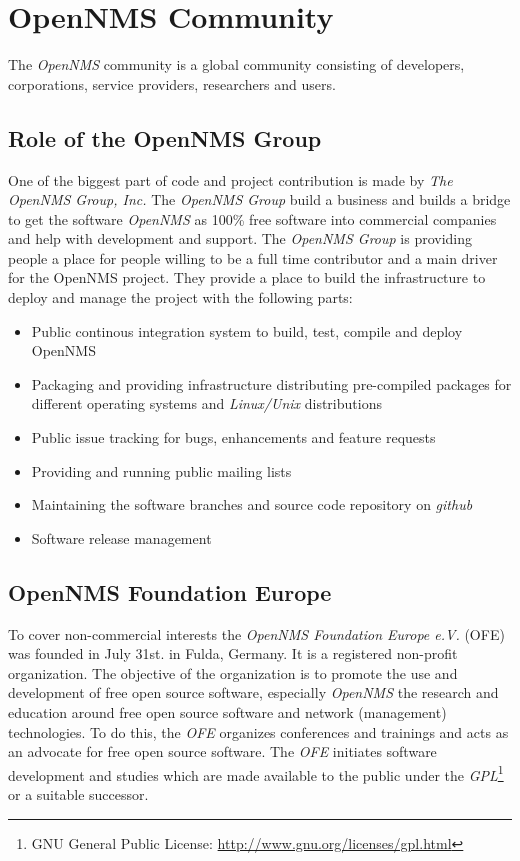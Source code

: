 \section{OpenNMS Community}
The \emph{OpenNMS} community is a global community consisting of developers, corporations, service providers, researchers and users.

\subsection*{Role of the OpenNMS Group}
One of the biggest part of code and project contribution is made by \emph{The OpenNMS Group, Inc.} The \emph{OpenNMS Group} build a business and builds a bridge to get the software \emph{OpenNMS} as 100\% free software into commercial companies and help with development and support. The \emph{OpenNMS Group} is providing people a place for people willing to be a full time contributor and a main driver for the OpenNMS project. They provide a place to build the infrastructure to deploy and manage the project with the following parts:
\begin{itemize}
  \item Public continous integration system to build, test, compile and deploy OpenNMS 
  \item Packaging and providing infrastructure distributing pre-compiled packages for different operating systems and \emph{Linux/Unix} distributions
  \item Public issue tracking for bugs, enhancements and feature requests
  \item Providing and running public mailing lists
  \item Maintaining the software branches and source code repository on \emph{github}
  \item Software release management
\end{itemize}

\subsection*{OpenNMS Foundation Europe}
To cover non-commercial interests the \emph{OpenNMS Foundation Europe e.V.} (OFE) was founded in July 31st. in Fulda, Germany. It is a registered non-profit organization. The objective of the organization is to promote the use and development of free open source software, especially \emph{OpenNMS} the research and education around free open source software and network (management) technologies. To do this, the \emph{OFE} organizes conferences and trainings and acts as an advocate for free open source software. The \emph{OFE} initiates software development and studies which are made available to the public under the \emph{GPL}\footnote{GNU General Public License: \url{http://www.gnu.org/licenses/gpl.html}} or a suitable successor.

